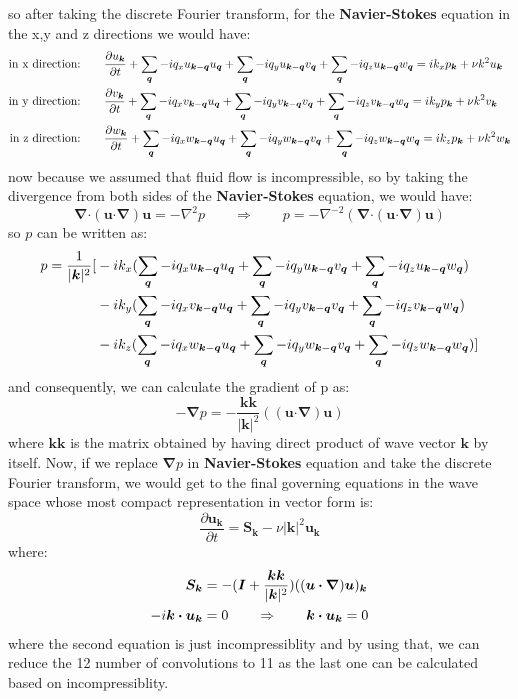\documentclass[10pt]{article}
\def\dotp{\bm{\cdot}}
\def\grad{\bm{\nabla}}
\def\lap{{\nabla}^2}
\def\lapinv{{\nabla}^{-2}}
\def\soo{\qquad\Rightarrow\qquad}
\def\S{\bm{S}}
\def\k{\bm{k}}
\def\q{\bm{q}}
\def\u{\bm{u}}
\begin{document}
%
so after taking the discrete Fourier transform, for the \textbf{Navier-Stokes} equation in the x,y and z directions we would have:
%
\begin{align}
\text{in x direction:}&\qquad \frac{\partial u_{\k}}{\partial t} + \sum_{\q}{-iq_{x}u_{\k-\q}u_{\q}} + \sum_{\q}{-iq_{y}u_{\k-\q}v_{\q}} + \sum_{\q}{-iq_{z}u_{\k-\q}w_{\q}} = ik_{x}p_{\k} + \nu k^2 u_{\k}                 \notag 
\\
\text{in y direction:}&\qquad \frac{\partial v_{\k}}{\partial t} + \sum_{\q}{-iq_{x}v_{\k-\q}u_{\q}} + \sum_{\q}{-iq_{y}v_{\k-\q}v_{\q}} + \sum_{\q}{-iq_{z}v_{\k-\q}w_{\q}} = ik_{y}p_{\k} + \nu k^2 v_{\k} 
\\
\text{in z direction:}&\qquad \frac{\partial w_{\k}}{\partial t} + \sum_{\q}{-iq_{x}w_{\k-\q}u_{\q}} + \sum_{\q}{-iq_{y}w_{\k-\q}v_{\q}} + \sum_{\q}{-iq_{z}w_{\k-\q}w_{\q}} = ik_{z}p_{\k} + \nu k^2 w_{\k} 				   \notag
\end{align}
%
now because we assumed that fluid flow is incompressible, so by taking the divergence from both sides of the \textbf{Navier-Stokes} equation, we would have:
%
\begin{equation}
\grad\dotp(\u\dotp\grad)\u=-\lap p \soo p=-\lapinv(\grad\dotp(\u\dotp\grad)\u)
\end{equation}
%
so $p$ can be written as:
%
\begin{align}
p=\frac{1}{|\k|^2}[&-ik_{x}(\sum_{\q}{-iq_{x}u_{\k-\q}u_{\q}} + \sum_{\q}{-iq_{y}u_{\k-\q}v_{\q}} + \sum_{\q}{-iq_{z}u_{\k-\q}w_{\q}}) 					\notag
\\ 
&-ik_{y}(\sum_{\q}{-iq_{x}v_{\k-\q}u_{\q}} + \sum_{\q}{-iq_{y}v_{\k-\q}v_{\q}} + \sum_{\q}{-iq_{z}v_{\k-\q}w_{\q}})  
\\
&-ik_{z}(\sum_{\q}{-iq_{x}w_{\k-\q}u_{\q}} + \sum_{\q}{-iq_{y}w_{\k-\q}v_{\q}} + \sum_{\q}{-iq_{z}w_{\k-\q}w_{\q}})] 										\notag
\end{align}
%
and consequently, we can calculate the gradient of p as:
%
\begin{equation}
-\grad p=-\frac{\k\k}{|\k|^2}((\u\dotp\grad)\u)
\end{equation}
%
where $\k\k$ is the matrix obtained by having direct product of wave vector $\k$ by itself. Now, if we replace $\grad p$ in \textbf{Navier-Stokes} equation and take the discrete Fourier transform, we would get to the final governing equations in the wave space whose most compact representation in vector form is:
%
\begin{equation}
\frac{\partial {\u}_{\k}}{\partial t} = {\S}_{\k} -\nu{|\k|}^2{\u}_{\k}
\end{equation}
where:
%
\begin{align}
\S_{\k}&=-(\bm{I} + \frac{\k\k}{|\k|^2})((\u\dotp\grad)\u)_{\k} \notag 
\\
-i\k\dotp{\u}_{\k}&=0 \soo \k\dotp{\u}_{\k}=0
\end{align}
%
where the second equation is just incompressiblity  and by using that, we can reduce the 12 number of convolutions to 11 as the last one can be calculated based on incompressiblity.
\end{document}
